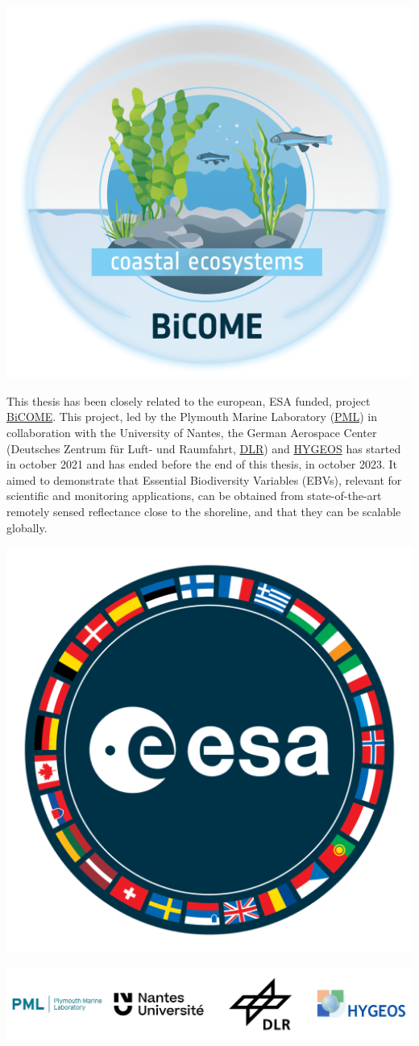 \documentclass[
  letterpaper,
  11pt,
  english,
  singlespacing,
  headsepline]{MastersDoctoralThesis}
\begin{document}
\begin{center}
\includegraphics[width=0.4\linewidth,height=\textheight,keepaspectratio]{images/BiCOME Logo.png}
\end{center}
This thesis has been closely related to the european, ESA funded,
project \href{https://bicome.info}{BiCOME}. This project, led by the
Plymouth Marine Laboratory (\href{https://pml.ac.uk}{PML}) in
collaboration with the University of Nantes, the German Aerospace Center
(Deutsches Zentrum für Luft- und Raumfahrt,
\href{https://www.dlr.de/en}{DLR}) and
\href{https://hygeos.com/en/}{HYGEOS} has started in october 2021 and
has ended before the end of this thesis, in october 2023. It aimed to
demonstrate that Essential Biodiversity Variables (EBVs), relevant for
scientific and monitoring applications, can be obtained from
state-of-the-art remotely sensed reflectance close to the shoreline, and
that they can be scalable globally.

\begin{center}
\includegraphics[width=0.4\linewidth,height=\textheight,keepaspectratio]{images/ESA_Logo.png}
\end{center}

\begin{center}
\includegraphics[width=1\linewidth,height=\textheight,keepaspectratio]{images/logos_BICOME.png}
\end{center}
\end{document}
